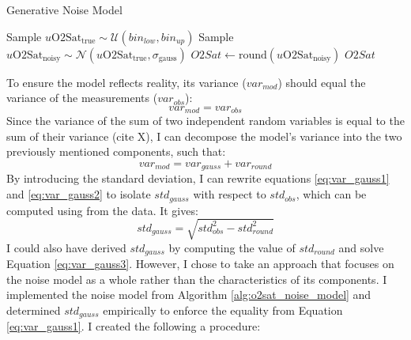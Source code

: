 \begin{algorithm}
    \caption{\textsc{\OXSat} Generative Noise Model}\label{alg:o2sat_noise_model}
    \begin{algorithmic}[1]
        \State Sample $u\mathrm{O2Sat}_{\mathrm{true}} \sim \mathcal{U}(\mathit{bin_{low}}, \mathit{bin_{up}})$
        \State Sample $u\mathrm{O2Sat}_{\mathrm{noisy}} \sim \mathcal{N}(u\mathrm{O2Sat}_{\mathrm{true}}, \sigma_{\mathrm{gauss}})$
        \State $O2Sat \gets \mathrm{round}(u\mathrm{O2Sat}_{\mathrm{noisy}})$
        \State \Return $O2Sat$
    \EndFunction
    \end{algorithmic}
\end{algorithm}

To ensure the model reflects reality, its variance ($var_{mod}$) should equal the variance of the \OXSat measurements ($var_{obs}$):
\begin{equation} \label{eq:var_gauss1}
    var_{mod} = var_{obs}
\end{equation}
Since the variance of the sum of two independent random variables is equal to the sum of their variance (cite X), I can decompose the model's variance into the two previously mentioned components, such that:
\begin{equation} \label{eq:var_gauss2}
    var_{mod} = var_{gauss} + var_{round}
\end{equation}
By introducing the standard deviation, I can rewrite equations \ref{eq:var_gauss1} and \ref{eq:var_gauss2} to isolate $std_{gauss}$ with respect to $std_{obs}$, which can be computed using from the data. It gives:
\begin{equation} \label{eq:var_gauss3}
    std_{gauss} = \sqrt{std_{obs}^2 - std_{round}^2}
\end{equation}
I could also have derived $std_{gauss}$ by computing the value of $std_{round}$ and solve Equation \ref{eq:var_gauss3}. However, I chose to take an approach that focuses on the noise model as a whole rather than the characteristics of its components. I implemented the noise model from Algorithm \ref{alg:o2sat_noise_model} and determined $std_{gauss}$ empirically to enforce the equality from Equation \ref{eq:var_gauss1}. I created the following a procedure:
